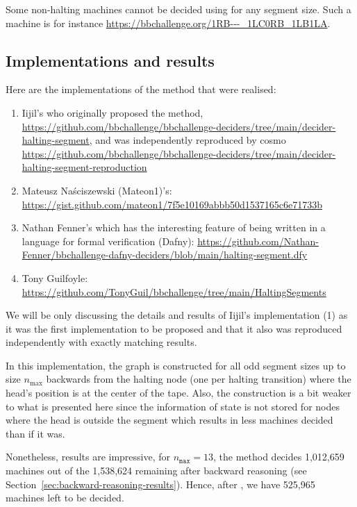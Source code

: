 \begin{remark}
  \normalfont Some non-halting machines cannot be decided using \HS for any segment size. Such a machine is for instance \url{https://bbchallenge.org/1RB---_1LC0RB_1LB1LA}.
\end{remark}

\subsection{Implementations and results}\label{sec:hs-implem}


Here are the implementations of the method that were realised:

\begin{enumerate}
  \item Iijil's who originally proposed the method, \url{https://github.com/bbchallenge/bbchallenge-deciders/tree/main/decider-halting-segment}, and was independently reproduced by cosmo \url{https://github.com/bbchallenge/bbchallenge-deciders/tree/main/decider-halting-segment-reproduction}
  \item Mateusz Naściszewski (Mateon1)'s: \url{https://gist.github.com/mateon1/7f5e10169abbb50d1537165c6e71733b}
  \item Nathan Fenner's which has the interesting feature of being written in a language for formal verification (Dafny): \url{https://github.com/Nathan-Fenner/bbchallenge-dafny-deciders/blob/main/halting-segment.dfy}
  \item Tony Guilfoyle: \url{https://github.com/TonyGuil/bbchallenge/tree/main/HaltingSegments}
\end{enumerate}

We will be only discussing the details and results of Iijil's implementation (1) as it was the first implementation to be proposed and that it also was reproduced independently with exactly matching results.

In this implementation, the \HS graph is constructed for all odd segment sizes up to size $n_\text{max}$ backwards from the halting node (one per halting transition) where the head's position is at the center of the tape. Also, the construction is a bit weaker to what is presented here since the information of state is not stored for nodes where the head is outside the segment which results in less machines decided than if it was.

Nonetheless, results are impressive, for $n_\texttt{max} = 13$, the method decides 1,012,659 machines out of the 1,538,624 remaining after backward reasoning (see Section~\ref{sec:backward-reasoning-results}). Hence, after \HS, we have 525,965 machines left to be decided.